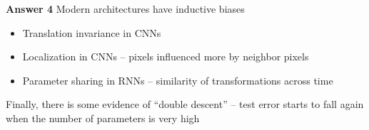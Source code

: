 \begin{frame}
    
    \textbf{Answer 4} Modern architectures have inductive biases 

            \vspace{0.5em}
            \vspace{0.5em}

    \Egs

    \begin{itemize}
        \item Translation invariance in CNNs 
            \vspace{0.5em}
        \item Localization in CNNs -- pixels influenced more by neighbor pixels 
            \vspace{0.5em}
        \item Parameter sharing in RNNs -- similarity of transformations across
            time
    \end{itemize}

            \vspace{0.5em}

    
\end{frame}


\begin{frame}
    
    Finally, there is some evidence of ``double descent'' -- test error starts to fall again
    when the number of parameters is very high

\end{frame}


